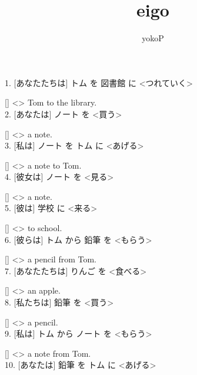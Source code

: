\documentclass[uplatex,
paper=a4,
fontsize=18pt,
jafontsize=16pt,
number_of_lines=30,
line_length=30zh,
baselineskip=25pt,
]{jlreq}
\author{yokoP}
\title{eigo}
\begin{document}
1.  [あなたたちは] トム を 図書館 に <つれていく>

  [\hspace{3em}] <\hspace{3em}> Tom to the library.
\\

2.  [あなたは] ノート を <買う>

  [\hspace{3em}] <\hspace{3em}> a note.
\\

3.  [私は] ノート を トム に <あげる>

  [\hspace{3em}] <\hspace{3em}> a note to Tom.
\\

4.  [彼女は] ノート を <見る>

  [\hspace{3em}] <\hspace{3em}> a note.
\\

5.  [彼は] 学校 に <来る>

  [\hspace{3em}] <\hspace{3em}> to school.
\\

6.  [彼らは] トム から 鉛筆 を <もらう>

  [\hspace{3em}] <\hspace{3em}> a pencil from Tom.
\\

7.  [あなたたちは] りんご を <食べる>

  [\hspace{3em}] <\hspace{3em}> an apple.
\\

8.  [私たちは] 鉛筆 を <買う>

  [\hspace{3em}] <\hspace{3em}> a pencil.
\\

9.  [私は] トム から ノート を <もらう>

  [\hspace{3em}] <\hspace{3em}> a note from Tom.
\\

10.  [あなたは] 鉛筆 を トム に <あげる>
\end{document}
